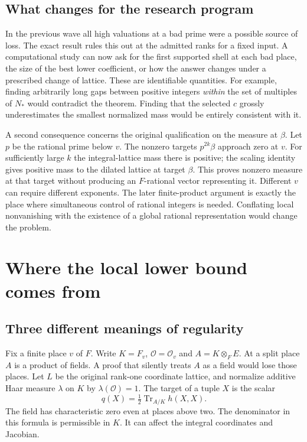 \documentclass[12pt,letterpaper]{article}
\begin{document}
\subsection{What changes for the research program}
In the previous wave all high valuations at a bad prime were a possible source of loss. The exact result rules this out at the admitted ranks for a fixed input. A computational study can now ask for the first supported shell at each bad place, the size of the best lower coefficient, or how the answer changes under a prescribed change of lattice. These are identifiable quantities. For example, finding arbitrarily long gaps between positive integers \emph{within} the set of multiples of $N_*$ would contradict the theorem. Finding that the selected $c$ grossly underestimates the smallest normalized mass would be entirely consistent with it.
\par
A second consequence concerns the original qualification on the measure at $\beta$. Let $p$ be the rational prime below $v$. The nonzero targets $p^{2k}\beta$ approach zero at $v$. For sufficiently large $k$ the integral-lattice mass there is positive; the scaling identity gives positive mass to the dilated lattice at target $\beta$. This proves nonzero measure at that target without producing an $F$-rational vector representing it. Different $v$ can require different exponents. The later finite-product argument is exactly the place where simultaneous control of rational integers is needed. Conflating local nonvanishing with the existence of a global rational representation would change the problem.

\section{Where the local lower bound comes from}
\subsection{Three different meanings of regularity}

Fix a finite place $v$ of $F$. Write $K=F_v$, $\mathcal O=\mathcal O_v$ and $A=K\otimes_F E$. At a split place $A$ is a product of fields. A proof that silently treats $A$ as a field would lose those places. Let $L$ be the original rank-one coordinate lattice, and normalize additive Haar measure $\lambda$ on $K$ by $\lambda(\mathcal O)=1$. The target of a tuple $X$ is the scalar
\[
 q(X)=\tfrac12\operatorname{Tr}_{A/K}h(X,X).
\]
The field has characteristic zero even at places above two. The denominator in this formula is permissible in $K$. It can affect the integral coordinates and Jacobian.
\end{document}
